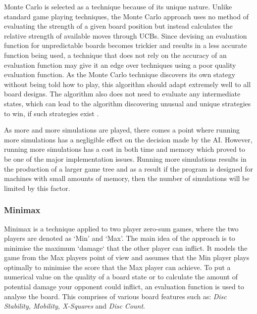 \documentclass[12pt,a4paper]{article}
\begin{document}
Monte Carlo is selected as a technique because of its unique nature. Unlike standard game playing techniques, the Monte Carlo approach uses no method of evaluating the strength of a given board position but instead calculates the relative strength of available moves through UCBs. Since devising an evaluation function for unpredictable boards becomes trickier and results in a less accurate function being used, a technique that does not rely on the accuracy of an evaluation function may give it an edge over techniques using a poor quality evaluation function. As the Monte Carlo technique discovers its own stategy without being told how to play, this algorithm should adapt extremely well to all board designs. The algorithm also does not need to evaluate any intermediate states, which can lead to the algorithm discovering unusual and unique strategies to win, if such strategies exist \cite{browne2012survey}.

As more and more simulations are played, there comes a point where running more simulations has a negligible effect on the decision made by the AI. However, running more simulations has a cost in both time and memory which proved to be one of the major implementation issues. Running more simulations results in the production of a larger game tree and as a result  if the program is designed for machines with small amounts of memory, then the number of simulations will be limited by this factor.


\subsubsection{Minimax}

Minimax is a technique applied to two player zero-sum games, where the two players are denoted as `Min' and `Max'. The main idea of the approach is to minimise the maximum `damage` that the other player can inflict. It models the game from the Max players point of view and assumes that the Min player plays optimally to minimise the score that the Max player can achieve. To put a numerical value on the quality of a board state or to calculate the amount of potential damage your opponent could inflict, an evaluation function is used to analyse the board. This comprises of various board features such as: \textit{Disc Stability, Mobility, X-Squares} and \textit{Disc Count}.
\end{document}
